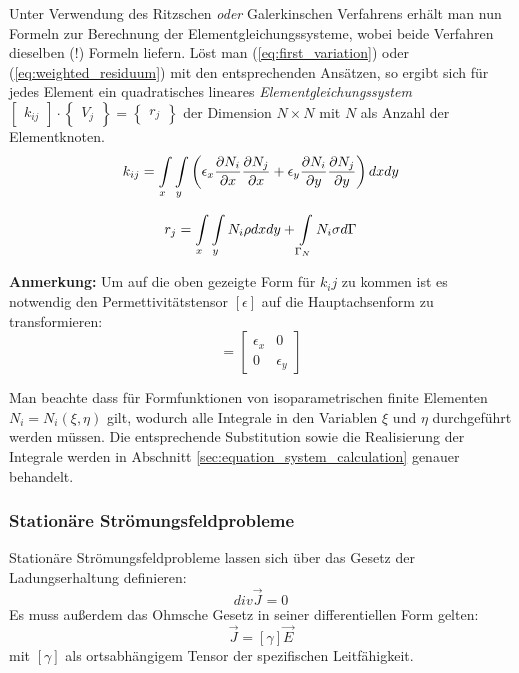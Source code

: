 Unter Verwendung des Ritzschen \textit{oder} Galerkinschen Verfahrens erhält man nun Formeln zur Berechnung der Elementgleichungssysteme, wobei beide Verfahren dieselben (!) Formeln liefern. Löst man (\ref{eq:first_variation}) oder (\ref{eq:weighted_residuum}) mit den entsprechenden Ansätzen, so ergibt sich für jedes Element ein quadratisches lineares \textit{Elementgleichungssystem} $\begin{bmatrix}k_{ij}\end{bmatrix} \cdot \begin{Bmatrix}V_j\end{Bmatrix} = \begin{Bmatrix}r_j\end{Bmatrix}$ der Dimension $N\times N$ mit $N$ als Anzahl der Elementknoten.
\begin{equation}
\label{eq:k_ij_e_static}
k_{ij} = \int\displaylimits_{x} \int\displaylimits_{y} \left(\epsilon_x \frac{\partial N_i}{\partial x}\frac{\partial N_j}{\partial x} +  \epsilon_y\frac{\partial N_i}{\partial y}\frac{\partial N_j}{\partial y}\right)dx dy
\end{equation}


\begin{equation}
\label{eq:right_side_e_static}
	r_j = \int\displaylimits_{x} \int\displaylimits_{y} N_i \rho dx dy + \int\displaylimits_{\Gamma_N} N_i\sigma d\Gamma
\end{equation}

\textbf{Anmerkung:} Um auf die oben gezeigte Form für $k_ij$ zu kommen ist es notwendig den Permettivitätstensor $[\epsilon]$ auf die Hauptachsenform zu transformieren:
\begin{equation*}
	[\epsilon] = \begin{bmatrix}
	\epsilon_x & 0 \\
	0 & \epsilon_y
	\end{bmatrix}
\end{equation*}

Man beachte dass für Formfunktionen von isoparametrischen finite Elementen $N_i = N_i(\xi, \eta)$ gilt, wodurch alle Integrale in den Variablen $\xi$ und $\eta$ durchgeführt werden müssen. Die entsprechende Substitution sowie die Realisierung der Integrale werden in Abschnitt \ref{sec:equation_system_calculation} genauer behandelt. 


\subsubsection{Stationäre Strömungsfeldprobleme}
\label{sec:stat_current_problems}
Stationäre Strömungsfeldprobleme lassen sich über das Gesetz der Ladungserhaltung definieren:
\begin{equation}
	\mathit{div}\vec{J} = 0
\end{equation}
 Es muss außerdem das Ohmsche Gesetz in seiner differentiellen Form gelten:
 \begin{equation}
 	\vec{J} = [\gamma] \vec{E}
 \end{equation}
 mit $[\gamma]$ als ortsabhängigem Tensor der spezifischen Leitfähigkeit.\newline
 
